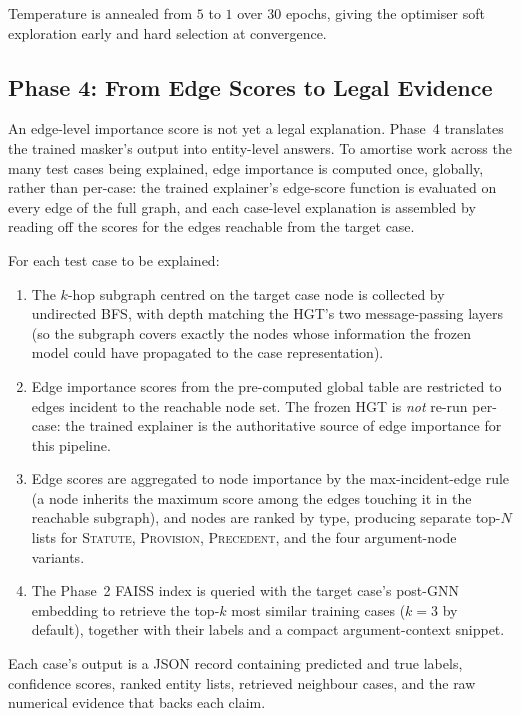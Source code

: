 Temperature is annealed from $5$ to $1$ over 30 epochs, giving the
optimiser soft exploration early and hard selection at convergence.

\subsection{Phase 4: From Edge Scores to Legal Evidence}

An edge-level importance score is not yet a legal explanation.
Phase~4 translates the trained masker's output into entity-level
answers.  To amortise work across the many test cases being
explained, edge importance is computed once, globally, rather than
per-case: the trained explainer's edge-score function is evaluated on
every edge of the full graph, and each case-level explanation is
assembled by reading off the scores for the edges reachable from the
target case.

For each test case to be explained:

\begin{enumerate}
  \item The $k$-hop subgraph centred on the target case node is
    collected by undirected BFS, with depth matching the HGT's two
    message-passing layers (so the subgraph covers exactly the nodes
    whose information the frozen model could have propagated to the
    case representation).
  \item Edge importance scores from the pre-computed global table
    are restricted to edges incident to the reachable node set.  The
    frozen HGT is \emph{not} re-run per-case: the trained explainer
    is the authoritative source of edge importance for this pipeline.
  \item Edge scores are aggregated to node importance by the
    max-incident-edge rule (a node inherits the maximum score among
    the edges touching it in the reachable subgraph), and nodes are
    ranked by type, producing separate top-$N$ lists for
    \textsc{Statute}, \textsc{Provision}, \textsc{Precedent}, and
    the four argument-node variants.
  \item The Phase~2 FAISS index is queried with the target case's
    post-GNN embedding to retrieve the top-$k$ most similar training
    cases ($k\!=\!3$ by default), together with their labels and a
    compact argument-context snippet.
\end{enumerate}

Each case's output is a JSON record containing predicted and true
labels, confidence scores, ranked entity lists, retrieved neighbour
cases, and the raw numerical evidence that backs each claim.

